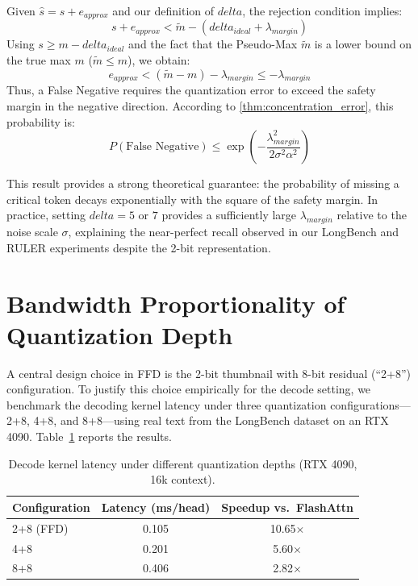 \documentclass[]{mosi}
\def\delta{delta}%
\theoremstyle{plain}
\theoremstyle{definition}
\theoremstyle{remark}
\begin{document}
Given $\hat{s} = s + e_{approx}$ and our definition of $\delta$, the rejection condition implies:
\begin{equation}
    s + e_{approx} < \tilde{m} - (\delta_{ideal} + \lambda_{margin})
\end{equation}
Using $s \ge m - \delta_{ideal}$ and the fact that the Pseudo-Max $\tilde{m}$ is a lower bound on the true max $m$ ($\tilde{m} \le m$), we obtain:
\begin{equation}
    e_{approx} < (\tilde{m} - m) - \lambda_{margin} \le -\lambda_{margin}
\end{equation}
Thus, a False Negative requires the quantization error to exceed the safety margin in the negative direction. According to \cref{thm:concentration_error}, this probability is:
\begin{equation}
    P(\text{False Negative}) \le \exp \left( - \frac{\lambda_{margin}^2}{2 \sigma^2 \alpha^2} \right)
\end{equation}

This result provides a strong theoretical guarantee: the probability of missing a critical token decays exponentially with the square of the safety margin. In practice, setting $\delta=5$ or $7$ provides a sufficiently large $\lambda_{margin}$ relative to the noise scale $\sigma$, explaining the near-perfect recall observed in our LongBench and RULER experiments despite the 2-bit representation.


\section{Bandwidth Proportionality of Quantization Depth}
\label{app:bandwidth}

A central design choice in FFD is the 2-bit thumbnail with 8-bit residual (``2+8'') configuration. To justify this choice empirically for the decode setting, we benchmark the decoding kernel latency under three quantization configurations---2+8, 4+8, and 8+8---using real text from the LongBench dataset on an RTX 4090. Table~\ref{tab:quant_depth} reports the results.

\begin{table}[h]
\caption{Decode kernel latency under different quantization depths (RTX 4090, 16k context).}
\label{tab:quant_depth}
\begin{center}
\begin{tabular}{lcc}
\toprule
Configuration & Latency (ms/head) & Speedup vs.\ FlashAttn \\
\midrule
2+8 (FFD)   & 0.105 & 10.65$\times$ \\
4+8         & 0.201 & 5.60$\times$ \\
8+8         & 0.406 & 2.82$\times$ \\
\bottomrule
\end{tabular}
\end{center}
\end{table}
\end{document}

